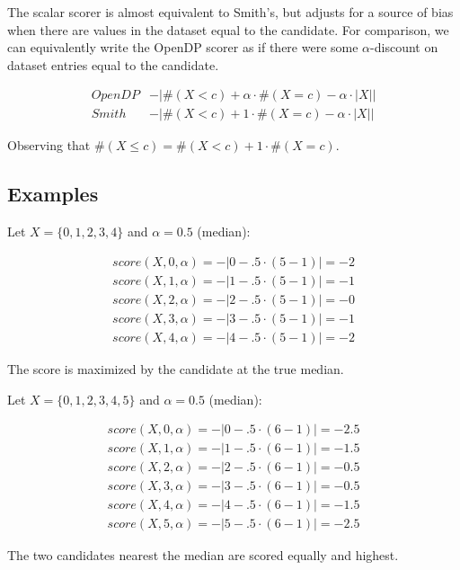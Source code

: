 \documentclass{article}
\begin{document}
The scalar scorer is almost equivalent to Smith's\cite{Smith11}, but adjusts for a source of bias when there are values in the dataset equal to the candidate.
For comparison, we can equivalently write the OpenDP scorer as if there were some $\alpha$-discount on dataset entries equal to the candidate.

\[
\begin{array}{cl}
    OpenDP &-|\#(X < c) + \alpha \cdot \#(X = c) - \alpha \cdot |X|| \\
    Smith &-|\#(X < c) + 1 \cdot \#(X = c) - \alpha \cdot |X||
\end{array}
\]

Observing that $\#(X \leq c) = \#(X < c) + 1 \cdot \#(X = c)$.


\subsection{Examples}

Let $X = \{0,1,2,3,4\}$ and $\alpha = 0.5$ (median):

\begin{align*}
    score(X, 0, \alpha) = -|0 - .5 \cdot (5 - 1)| = -2 \\
    score(X, 1, \alpha) = -|1 - .5 \cdot (5 - 1)| = -1 \\
    score(X, 2, \alpha) = -|2 - .5 \cdot (5 - 1)| = -0 \\
    score(X, 3, \alpha) = -|3 - .5 \cdot (5 - 1)| = -1 \\
    score(X, 4, \alpha) = -|4 - .5 \cdot (5 - 1)| = -2
\end{align*}

The score is maximized by the candidate at the true median.

Let $X = \{0,1,2,3,4,5\}$ and $\alpha = 0.5$ (median):

\begin{align*}
    score(X, 0, \alpha) = -|0 - .5 \cdot (6 - 1)| = -2.5 \\
    score(X, 1, \alpha) = -|1 - .5 \cdot (6 - 1)| = -1.5 \\
    score(X, 2, \alpha) = -|2 - .5 \cdot (6 - 1)| = -0.5 \\
    score(X, 3, \alpha) = -|3 - .5 \cdot (6 - 1)| = -0.5 \\
    score(X, 4, \alpha) = -|4 - .5 \cdot (6 - 1)| = -1.5 \\
    score(X, 5, \alpha) = -|5 - .5 \cdot (6 - 1)| = -2.5
\end{align*}

The two candidates nearest the median are scored equally and highest.
\end{document}
